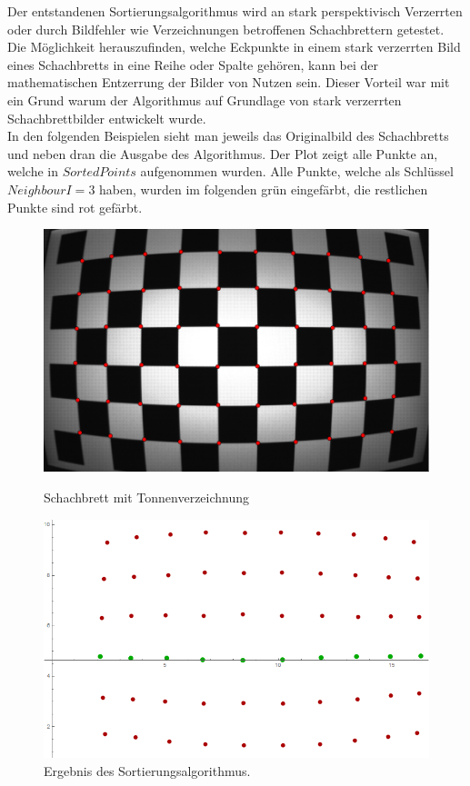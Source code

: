 Der entstandenen Sortierungsalgorithmus wird an stark perspektivisch Verzerrten oder durch Bildfehler wie Verzeichnungen betroffenen Schachbrettern getestet. Die Möglichkeit herauszufinden, welche Eckpunkte in einem stark verzerrten Bild eines Schachbretts in eine Reihe oder Spalte gehören, kann bei der mathematischen Entzerrung der Bilder von Nutzen sein. Dieser Vorteil war mit ein Grund warum der Algorithmus auf Grundlage von stark verzerrten Schachbrettbilder entwickelt wurde.\\

In den folgenden Beispielen sieht man jeweils das Originalbild des Schachbretts und neben dran die Ausgabe des Algorithmus. Der Plot zeigt alle Punkte an, welche in $SortedPoints$ aufgenommen wurden. Alle Punkte, welche als Schlüssel $NeighbourI = 3$ haben, wurden im folgenden grün eingefärbt, die restlichen Punkte sind rot gefärbt.


\begin{figure}[!htb]
	\includegraphics[width=\linewidth]{images/Tonnenverzeichnung.png}
	\caption[Schachbrett mit Tonnenverzeichnung]{Schachbrett mit Tonnenverzeichnung}
	\label{fig:Extreme1}
	\endminipage\hfill
	\includegraphics[width=\linewidth]{images/AlgTonnenverzeichnung.png}
	\caption[Sortierte Punkte eines Schachbretts mit Tonnenverzeichnung]{Ergebnis des Sortierungsalgorithmus.}
	\label{fig:Extreme2}
	\endminipage\hfill
\end{figure}


